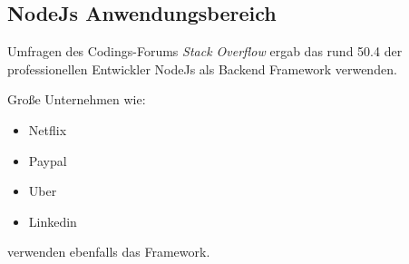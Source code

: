 \subsection{NodeJs Anwendungsbereich}
Umfragen des Codings-Forums \textit{Stack Overflow} ergab das rund 50.4%
der professionellen Entwickler NodeJs als Backend Framework verwenden.

Große Unternehmen wie:
\begin{itemize}
    \item Netflix
    \item Paypal
    \item Uber
    \item Linkedin
\end{itemize}
verwenden ebenfalls das Framework.
\cite{NodeJs1}
\cite{NodeJs2}

